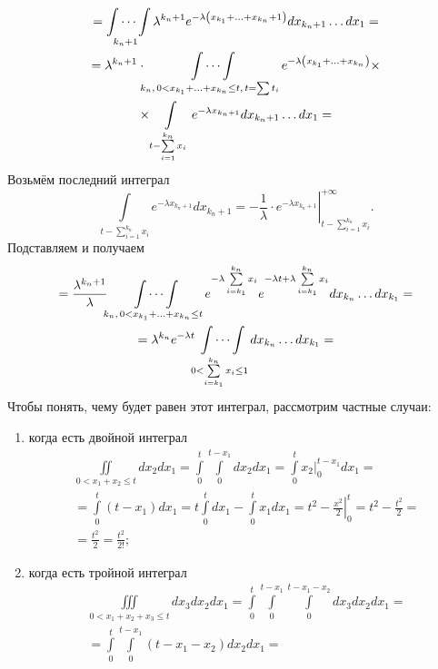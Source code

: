 \begin{enumerate}[label=\alph*)]
\begin{gather*}
    = \idotsint \limits_{k_n + 1}
      \lambda^{k_n + 1} e^{-\lambda \left( x_{k_1} + \dotsc + x_{k_n} + 1 \right) }
    dx_{k_n + 1} \dotsc dx_1 = \\
    = \lambda^{k_n + 1} \cdot
    \idotsint \limits_{k_n, \, 0 < x_{k_1} + \dotsc + x_{k_n} \leq t, \, t = \sum t_i}
      e^{-\lambda \left( x_{k_1} + \dotsc + x_{k_n} \right) } \times \\
       \times \int \limits_{t - \sum \limits_{i = 1}^{k_n} x_i}
        e^{-\lambda x_{k_n + 1}} dx_{k_n + 1} \dotsc dx_1 =
  \end{gather*}
  Возьмём последний интеграл
  $$ \int \limits_{t - \sum \limits_{i = 1}^{k_n} x_i} e^{-\lambda x_{k_n + 1}} dx_{k_n + 1} =
    \left.
      -\frac{1}{ \lambda } \cdot e^{-\lambda x_{k_n + 1}}
    \right|_{t - \sum \limits_{i = 1}^{k_n} x_i}^{+ \infty }.$$
  Подставляем и получаем
  \begin{gather*}
    = \frac{ \lambda^{k_n + 1}}{ \lambda }
    \idotsint \limits_{k_n, \, 0 < x_{k_1} + \dotsc + x_{k_n} \leq t}
      e^{-\lambda \sum \limits_{i = k_1}^{k_n} x_i}
      e^{-\lambda t + \lambda \sum \limits_{i = k_1}^{k_n} x_i} dx_{k_n} \dotsc dx_{k_1} = \\
   = \lambda^{k_n} e^{-\lambda t}
   \idotsint \limits_{0 < \sum \limits_{i = k_1}^{k_n} x_i \leq 1} dx_{k_n} \dotsc dx_{k_1} =
 \end{gather*}
  Чтобы понять, чему будет равен этот интеграл, рассмотрим частные случаи:
  \begin{enumerate}
    \item когда есть двойной интеграл
    \begin{gather*}
      \iint \limits_{0 < x_1 + x_2 \leq t} dx_2 dx_1 =
      \int \limits_0^t \int \limits_0^{t - x_1} dx_2 dx_1 =
      \int \limits_0^t \left. x_2 \right|_0^{t - x_1} dx_1 = \\
       =\int \limits_0^t \left( t - x_1 \right) dx_1 =
      t \int \limits_0^t dx_1 - \int \limits_0^t x_1 dx_1 =
      t^2 - \left. \frac{x^2}{2} \right|_0^t =
      t^2 - \frac{t^2}{2} = \\
      = \frac{t^2}{2} =
      \frac{t^2}{2!};
    \end{gather*}
    \item когда есть тройной интеграл
    \begin{gather*}\iiint \limits_{0 < x_1 + x_2 + x_3 \leq t} dx_3 dx_2 dx_1 =
      \int \limits_0^t \int \limits_0^{t - x_1} \int \limits_0^{t - x_1 - x_2} dx_3 dx_2 dx_1 = \\
      = \int \limits_0^t \int \limits_0^{t - x_1} \left( t - x_1 - x_2 \right) dx_2 dx_1 = \\

\end{gather*}
\end{enumerate}
\end{enumerate}
